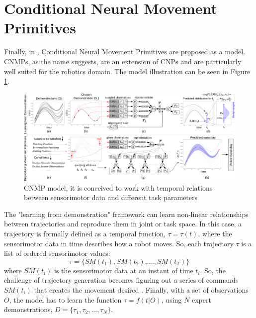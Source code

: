 \section{Conditional Neural Movement Primitives}
Finally, in \cite{Ugur-RSS-19}, Conditional Neural Movement Primitives are proposed as a model. CNMPs, as the name suggests, are an extension of CNPs and are particularly well suited for the robotics domain. The model illustration can be seen in Figure \ref{fig:cnmp}.  
\begin{figure}
	\centering
	\includegraphics[width=0.9\linewidth]{Images/CNMP.png}
	\caption{CNMP model, it is conceived to work with temporal relations between sensorimotor data and different task parameters}
	\label{fig:cnmp}
\end{figure}
The "learning from demonstration" framework can learn non-linear relationships between trajectories and reproduce them in joint or task space. In this case, a trajectory is formally defined as a temporal function, $\tau = \tau (t)$, where the sensorimotor data in time describes how a robot moves. So, each trajectory $\tau$ is a list of ordered sensorimotor values: 
\begin{equation}
    \tau = \{ SM(t_1), SM(t_2), ... , SM(t_T ) \}
\end{equation}
where $SM(t_i)$ is the sensorimotor data at an instant of time $t_i$.
So, the challenge of trajectory generation becomes figuring out a series of commands $SM(t_i)$ that creates the movement desired \cite{gasparetto2007new}. 
Finally, with a set of observations $O$, the model has to learn the function $\tau = f(t|O)$, using $N$ expert demonstrations, $D = \{\tau_1, \tau_2, ... , \tau_N \}$. 

